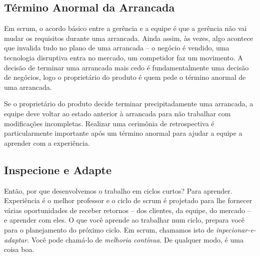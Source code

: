 \subsection{Término Anormal da Arrancada}

Em scrum, o acordo básico entre a gerência e a equipe é que a gerência não vai mudar os requisitos durante uma arrancada. Ainda assim, às vezes, algo acontece que invalida tudo no plano de uma arrancada -- o negócio é vendido, uma tecnologia disruptiva entra no mercado, um competidor faz um movimento. A decisão de terminar uma arrancada mais cedo é fundamentalmente uma decisão de negócios, logo o proprietário do produto é quem pede o término anormal de uma arrancada.

Se o proprietário do produto decide terminar precipitadamente uma arrancada, a equipe deve voltar ao estado anterior à arrancada para não trabalhar com modificações incompletas. Realizar uma cerimônia de retrospectiva é particularmente importante após um término anormal para ajudar a equipe a aprender com a experiência.

\subsection{Inspecione e Adapte}

Então, por que desenvolvemos o trabalho em ciclos curtos? Para aprender. Experiência é o melhor professor e o ciclo de scrum é projetado para lhe fornecer várias oportunidades de receber retornos -- dos clientes, da equipe, do mercado -- e aprender com eles.
O que você aprende ao trabalhar num ciclo, prepara você para o planejamento do próximo ciclo. Em scrum, chamamos isto de \emph{inpecionar-e-adaptar}. Você pode chamá-lo de \emph{melhoria contínua}. De qualquer modo, é uma coisa boa.
